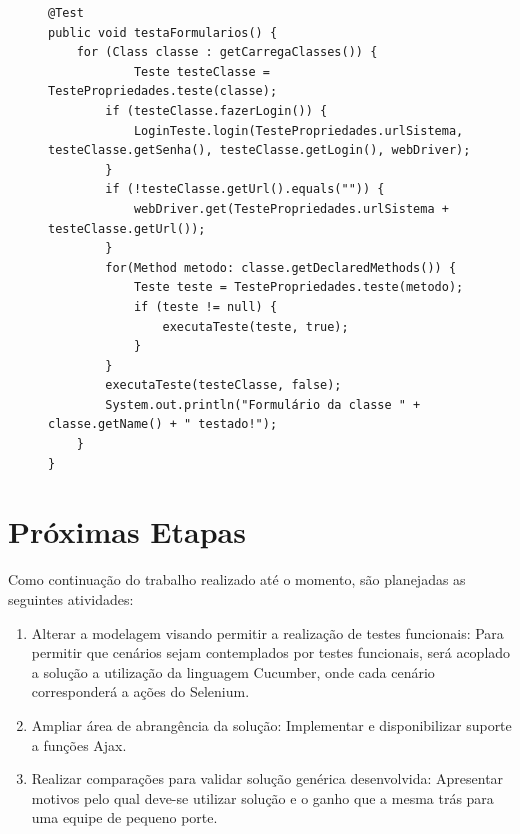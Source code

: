 \documentclass[tg]{mdtufsm}
\begin{document}
\begin{figure}[!htb]
\begin{lstlisting}
@Test
public void testaFormularios() {
	for (Class classe : getCarregaClasses()) {
    		Teste testeClasse = TestePropriedades.teste(classe);
        if (testeClasse.fazerLogin()) {
            LoginTeste.login(TestePropriedades.urlSistema, testeClasse.getSenha(), testeClasse.getLogin(), webDriver);
        }
        if (!testeClasse.getUrl().equals("")) {
            webDriver.get(TestePropriedades.urlSistema + testeClasse.getUrl());
        }
        for(Method metodo: classe.getDeclaredMethods()) {
            Teste teste = TestePropriedades.teste(metodo);
            if (teste != null) {    
                executaTeste(teste, true);
            }
        }
        executaTeste(testeClasse, false);
        System.out.println("Formulário da classe " + classe.getName() + " testado!");
	}     
}	
\end{lstlisting}
	\label{code:testaFormularios}
\end{figure}

\chapter{Próximas Etapas}
Como continuação do trabalho realizado até o momento, são planejadas as seguintes atividades:

\begin{enumerate}
	\item Alterar a modelagem visando permitir a realização de testes funcionais: Para permitir que cenários sejam contemplados por testes funcionais, será acoplado a solução a utilização da linguagem Cucumber, onde cada cenário corresponderá a ações do Selenium.
	\item Ampliar área de abrangência da solução: Implementar e disponibilizar suporte a funções Ajax.
	\item Realizar comparações para validar solução genérica desenvolvida: Apresentar motivos pelo qual deve-se utilizar solução e o ganho que a mesma trás para uma equipe de pequeno porte.
\end{enumerate}

\setlength{\baselineskip}{\baselineskip}


\end{document}
